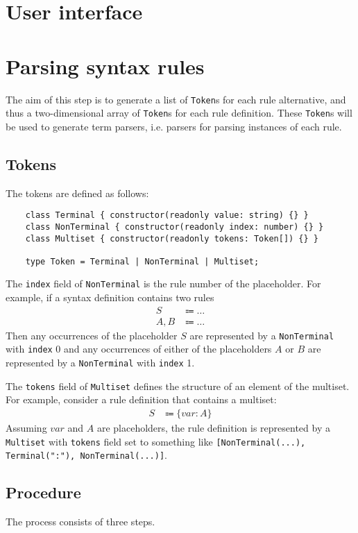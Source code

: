 \section{User interface}

\section{Parsing syntax rules}
The aim of this step is to generate a list of \lstinline{Token}s for each rule alternative, and thus a two-dimensional array of \lstinline{Token}s for each rule definition. These \lstinline{Token}s will be used to generate term parsers, i.e. parsers for parsing instances of each rule.

\subsection{Tokens}
The tokens are defined as follows:
\begin{lstlisting}
    class Terminal { constructor(readonly value: string) {} }
    class NonTerminal { constructor(readonly index: number) {} }
    class Multiset { constructor(readonly tokens: Token[]) {} }

    type Token = Terminal | NonTerminal | Multiset;
\end{lstlisting}
The \lstinline{index} field of \lstinline{NonTerminal} is the rule number of the placeholder. For example, if a syntax definition contains two rules
\begin{align*}
    S &\Coloneqq \ldots \\
    A, B &\Coloneqq \ldots
\end{align*}
Then any occurrences of the placeholder $S$ are represented by a \lstinline{NonTerminal} with \lstinline{index} 0 and any occurrences of either of the placeholders $A$ or $B$ are represented by a \lstinline{NonTerminal} with \lstinline{index} 1.

The \lstinline{tokens} field of \lstinline{Multiset} defines the structure of an element of the multiset. For example, consider a rule definition that contains a multiset:
\begin{align*}
    S &\Coloneqq \{ var: A \}
\end{align*}
Assuming $var$ and $A$ are placeholders, the rule definition is represented by a \lstinline{Multiset} with \lstinline{tokens} field set to something like \lstinline{[NonTerminal(...), Terminal(":"), NonTerminal(...)]}.

\subsection{Procedure}
The process consists of three steps.

